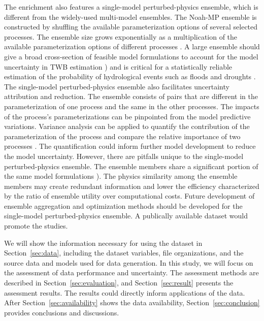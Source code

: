 \documentclass[essd]{copernicus}
\begin{document}
The enrichment also features a single-model perturbed-physics ensemble, which is different from the widely-used multi-model ensembles. The Noah-MP ensemble is constructed by shuffling the available parameterization options of several selected processes. The ensemble size grows exponentially as a multiplication of the available parameterization options of different processes \citep{yang2011JGRA, zhang2016JGRA, gan2019WRR}. A large ensemble should give a broad cross-section of feasible model formulations to account for the model uncertainty in TWB estimation \citep{telteu2021GMD, mitchell2004JGRA}) and is critical for a statistically reliable estimation of the probability of hydrological events such as floods and droughts \citep{troin2021WRR}. The single-model perturbed-physics ensemble also facilitates uncertainty attribution and reduction. The ensemble consists of pairs that are different in the parameterization of one process and the same in the other processes. The impacts of the process’s parameterizations can be pinpointed from the model predictive variations. Variance analysis can be applied to quantify the contribution of the parameterization of the process and compare the relative importance of two processes \citep{clark2011WRR, zheng2019WRR}. The quantification could inform further model development to reduce the model uncertainty. However, there are pitfalls unique to the single-model perturbed-physics ensemble. The ensemble members share a significant portion of the same model formulations \citep{fei2021WRR}). The physics similarity among the ensemble members may create redundant information and lower the efficiency characterized by the ratio of ensemble utility over computational costs. Future development of ensemble aggregation and optimization methods should be developed for the single-model perturbed-physics ensemble. A publically available dataset would promote the studies.

We will show the information necessary for using the dataset in Section~\ref{sec:data}, including the dataset variables, file organizations, and the source data and models used for data generation. In this study, we will focus on the assessment of data performance and uncertainty. The assessment methods are described in Section~\ref{sec:evaluation}, and Section~\ref{sec:result} presents the assessment results. The results could directly inform applications of the data. After Section~\ref{sec:availability} shows the data availability, Section~\ref{sec:conclusion} provides conclusions and discussions.
\end{document}
